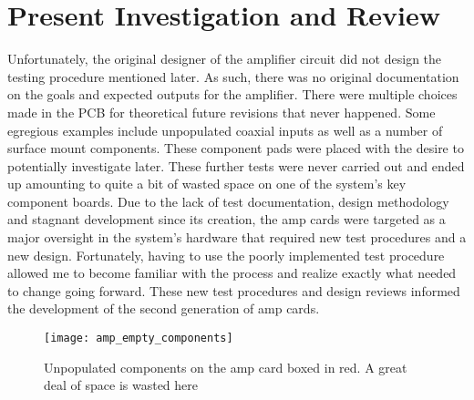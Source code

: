 \section{Present Investigation and Review}
Unfortunately, the original designer of the amplifier circuit did not design the testing procedure  mentioned later. As such, there was no original documentation on the goals and expected outputs for the amplifier. There were multiple choices made in the PCB for theoretical future revisions that never happened. Some egregious examples include unpopulated coaxial inputs as well as a number of surface mount components. These component pads were placed with the desire to potentially investigate later. These further tests were never carried out and ended up amounting to quite a bit of wasted space on one of the system's key component boards. Due to the lack of test documentation, design methodology and stagnant development since its creation, the amp cards were targeted as a major oversight in the system's hardware that required new test procedures and a new design. Fortunately, having to use the poorly implemented test procedure allowed me to become familiar with the process and realize exactly what needed to change going forward. These new test procedures and design reviews informed the development of the second generation of amp cards.
\begin{figure}[!htb]
	\centering
	\texttt{[image: amp\_empty\_components]}
	\caption{Unpopulated components on the amp card boxed in red. A great deal of space is wasted here}
\end{figure}